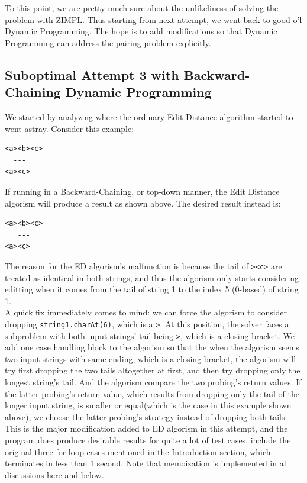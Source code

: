 \documentclass{article}
\begin{document}
To this point, we are pretty much sure about the unlikeliness of solving the problem with ZIMPL. Thus starting from next attempt, we went back to good o'l Dynamic Programming. The hope is to add modifications so that Dynamic Programming can address the pairing problem explicitly.

\subsection{Suboptimal Attempt 3 with Backward-Chaining Dynamic Programming}
We started by analyzing where the ordinary Edit Distance algorithm started to went astray. Consider this example:
\begin{lstlisting}
<a><b><c>
  ---
<a><c>
\end{lstlisting}
If running in a Backward-Chaining, or top-down manner, the Edit Distance algorism will produce a result as shown above. The desired result instead is:
\begin{lstlisting}
<a><b><c>
   ---
<a><c>
\end{lstlisting}
The reason for the ED algorism's malfunction is because the tail of \texttt{><c>} are treated as identical in both strings, and thus the algorism only starts considering editting when it comes from the tail of string 1 to the index 5 (0-based) of string 1.\\

A quick fix immediately comes to mind: we can force the algorism to consider dropping \texttt{string1.charAt(6)}, which is a \texttt{>}. At this position, the solver faces a subproblem with both input strings' tail being \texttt{>}, which is a closing bracket. We add one case handling block to the algorism so that the when the algorism seems two input strings with same ending, which is a closing bracket, the algorism will try first dropping the two tails altogether at first, and then try dropping only the longest string's tail. And the algorism compare the two probing's return values. If the latter probing's return value, which results from dropping only the tail of the longer input string, is smaller or equal(which is the case in this example shown above), we choose the latter probing's strategy instead of dropping both tails. \\

This is the major modification added to ED algorism in this attempt, and the program does produce desirable results for quite a lot of test cases, include the original three for-loop cases mentioned in the Introduction section, which terminates in less than 1 second. Note that memoization is implemented in all discussions here and below. \\
\end{document}
